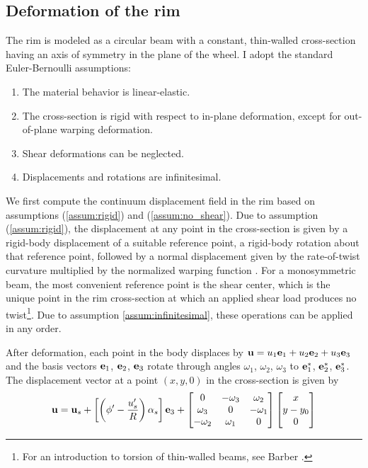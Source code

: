 \documentclass[\rootdir/thesis.tex]{subfiles}
\begin{document}
\subsection{Deformation of the rim}
\label{sec:rim_strain_energy}

The rim is modeled as a circular beam with a constant, thin-walled cross-section having an axis of symmetry in the plane of the wheel. I adopt the standard Euler-Bernoulli assumptions:

\begin{enumerate}
	\item{The material behavior is linear-elastic.}\label{assum:elastic}
	\item{The cross-section is rigid with respect to in-plane deformation, except for out-of-plane warping deformation.}\label{assum:rigid}
	\item{Shear deformations can be neglected.}\label{assum:no_shear} 
	\item{Displacements and rotations are infinitesimal.}\label{assum:infinitesimal}
\end{enumerate}

We first compute the continuum displacement field in the rim based on assumptions (\ref{assum:rigid}) and (\ref{assum:no_shear}). Due to assumption (\ref{assum:rigid}), the displacement at any point in the cross-section is given by a rigid-body displacement of a suitable reference point, a rigid-body rotation about that reference point, followed by a normal displacement given by the rate-of-twist curvature multiplied by the normalized warping function \cite{warping mechanics}. For a monosymmetric beam, the most convenient reference point is the shear center, which is the unique point in the rim cross-section at which an applied shear load produces no twist\footnote{For an introduction to torsion of thin-walled beams, see Barber \cite{Barber2011}.}. Due to assumption \ref{assum:infinitesimal}, these operations can be applied in any order.

After deformation, each point in the body displaces by $\mathbf{u}= u_1\mathbf{e}_1 + u_2\mathbf{e}_2 + u_3\mathbf{e}_3$ and the basis vectors $\mathbf{e}_1$, $\mathbf{e}_2$, $\mathbf{e}_3$ rotate through angles $\omega_1$, $\omega_2$, $\omega_3$ to $\mathbf{e}_1^*$, $\mathbf{e}_2^*$, $\mathbf{e}_3^*$. The displacement vector at a point $(x, y, 0)$ in the cross-section is given by
\begin{equation}
\label{eq:u}
\mathbf{u} = \mathbf{u}_s + \left[\left(\phi' - \frac{u_s'}{R}\right)\alpha_s\right]\mathbf{e}_3 +
\begin{bmatrix}
0        & -\omega_3& \omega_2\\
\omega_3 & 0        & -\omega_1\\
-\omega_2& \omega_1 & 0
\end{bmatrix}
\begin{bmatrix}x\\y - y_0\\0\end{bmatrix}
\end{equation}
\end{document}
